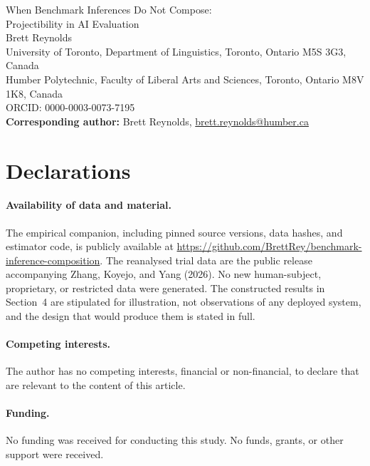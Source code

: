 \documentclass[12pt]{article}
\begin{document}
\begin{center}
{\LARGE When Benchmark Inferences Do Not Compose:\\[2pt]Projectibility in AI Evaluation}\\[16pt]
{\large Brett Reynolds\,}\\[4pt]
University of Toronto, Department of Linguistics, Toronto, Ontario M5S 3G3, Canada\\
Humber Polytechnic, Faculty of Liberal Arts and Sciences, Toronto, Ontario M8V 1K8, Canada\\[4pt]
ORCID: 0000-0003-0073-7195\\[10pt]
\textbf{Corresponding author:} Brett Reynolds,
\href{mailto:brett.reynolds@humber.ca}{brett.reynolds@humber.ca}
\end{center}

\vspace{2pt}
\section*{Declarations}

\paragraph{Availability of data and material.}
The empirical companion, including pinned source versions, data hashes, and
estimator code, is publicly available at
\url{https://github.com/BrettRey/benchmark-inference-composition}. The
reanalysed trial data are the public release accompanying Zhang, Koyejo, and
Yang (2026). No new human-subject, proprietary, or restricted data were
generated. The constructed results in Section~4 are stipulated for illustration,
not observations of any deployed system, and the design that would produce them
is stated in full.

\paragraph{Competing interests.}
The author has no competing interests, financial or non-financial, to declare
that are relevant to the content of this article.

\paragraph{Funding.}
No funding was received for conducting this study. No funds, grants, or other
support were received.
\end{document}
